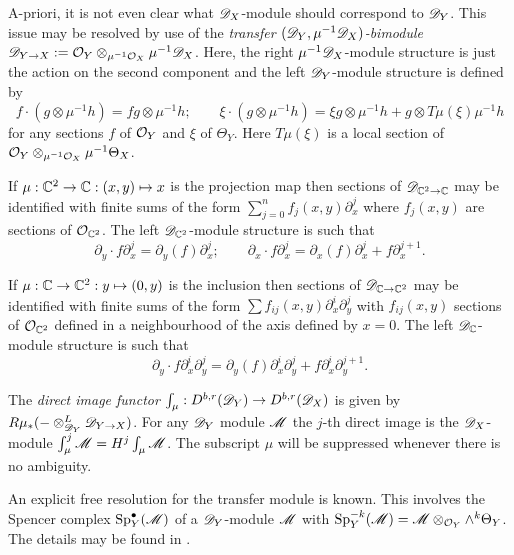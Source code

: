 A-priori, it is not even clear what $\mathscr{D}_X$-module should correspond to $\mathscr{D}_Y$.
This issue may be resolved by use of the {\it transfer $(\mathscr{D}_Y,\mu^{-1}\mathscr{D}_X)$-bimodule} $\mathscr{D}_{Y\to X}:= \mathcal{O}_Y \otimes_{\mu^{-1}\mathcal{O}_X}\mu^{-1}\mathscr{D}_X$.
Here, the right $\mu^{-1}\mathscr{D}_X$-module structure is just the action on the second component and the left $\mathscr{D}_Y$-module structure is defined by
$$f\cdot (g\otimes \mu^{-1}h) = fg \otimes \mu^{-1}h; \qquad \xi\cdot (g\otimes\mu^{-1}h) = \xi g \otimes \mu^{-1}h + g \otimes T\mu(\xi)\mu^{-1}h $$
for any sections $f$ of $\mathcal{O}_Y$ and $\xi$ of $\Theta_Y$.
Here $T\mu(\xi)$ is a local section of $\mathcal{O}_Y\otimes_{\mu^{-1}\mathcal{O}_X} \mu^{-1}\Theta_X$.
\begin{example}
  If $\mu:\mathbb{C}^2 \to \mathbb{C}:(x,y)\mapsto x$ is the projection map then sections of $\mathscr{D}_{\mathbb{C}^2\to \mathbb{C} }$ may be identified with finite sums of the form $\sum_{j=0}^n f_j(x,y)\partial_x^j$ where $f_j(x,y)$ are sections of $\mathcal{O}_{\mathbb{C}^2}$.
  The left $\mathscr{D}_{\mathbb{C}^2}$-module structure is such that
  $$\partial_y \cdot f\partial_x^j = \partial_{y}(f)\partial_x^j;\qquad \partial_x\cdot f\partial_{x}^j = \partial_x(f)\partial_x^j + f \partial_x^{j+1}.$$
\end{example}
\begin{example}
  If $\mu:\mathbb{C} \to \mathbb{C}^2: y \mapsto (0,y)$ is the inclusion then sections of $\mathscr{D}_{\mathbb{C}\to \mathbb{C}^2}$ may be identified with finite sums of the form $\sum f_{ij}(x,y)\partial_x^i \partial_y^j$ with $f_{ij}(x,y)$ sections of $\mathcal{O}_{\mathbb{C}^2}$ defined in a neighbourhood of the axis defined by $x=0$.
  The left $\mathscr{D}_{\mathbb{C}}$-module structure is such that
  $$
    \partial_y \cdot f\partial_x^i\partial_y^j = \partial_{y}(f)\partial_x^i\partial_y^j + f \partial_x^i\partial_y^{j+1}.
  $$
\end{example}
\begin{definition}
  The {\it direct image functor} $\int_\mu:D^{b,r}(\mathscr{D}_Y)\to D^{b,r}(\mathscr{D}_X)$ is given by $R\mu_* ({-}\otimes_{\mathscr{D}_Y}^L \mathscr{D}_{Y\to X})$.
  For any $\mathscr{D}_Y$ module $\mathscr{M}$ the $j$-th direct image is the $\mathscr{D}_X$-module $\int_\mu^j \mathscr{M} = H^j \int_\mu \mathscr{M}$.
  The subscript $\mu$ will be suppressed whenever there is no ambiguity.
\end{definition}
\begin{remark}\label{rem: Spencer}
  An explicit free resolution for the transfer module is known.
  This involves the Spencer complex $\operatorname{Sp}_Y^\bullet(\mathscr{M})$ of a $\mathscr{D}_Y$-module $\mathscr{M}$ with $\operatorname{Sp}_Y^{-k}(\mathscr{M}) = \mathscr{M}\otimes_{\mathcal{O}_Y}\wedge^k \Theta_Y$.
  The details may be found in \cite{sabbah2011introduction}.
\end{remark}
